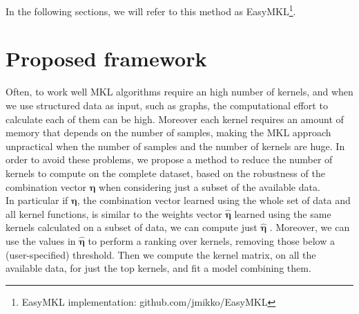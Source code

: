 \documentclass{esannV2}
\newcommand{\yy}{{\bf y}}
\newcommand{\KK}{{\bf K}}
\newcommand{\YY}{{\bf Y}}
\newcommand{\XX}{{\bf X}}
\newcommand{\1}{{\bf 1}}
\begin{document}
In the following sections, we will refer to this method as EasyMKL\footnote{EasyMKL implementation: github.com/jmikko/EasyMKL}.


\section{Proposed framework}
Often, to work well MKL algorithms require an high number of kernels, and when we use structured data as input, such as graphs, the computational effort to calculate each of them can be high. Moreover each kernel requires an amount of memory that depends on the number of samples, making the MKL approach unpractical when the number of samples and the number of kernels are huge.
In order to avoid these problems, we propose a method to reduce the number of kernels to compute on the complete dataset, based on the robustness of the combination vector $\boldsymbol{\eta}$ when considering just a subset of the available data.\\
In particular if $\boldsymbol{\eta}$, the combination vector learned using the whole set of data and all kernel functions, is similar to the weights vector $\hat{\boldsymbol{\eta}}$ learned using the same kernels calculated on a subset of data, we can compute just $\hat{\boldsymbol{\eta}}$ .
Moreover, we can use the values in $\hat{\boldsymbol{\eta}}$ to perform a ranking over kernels, removing those below a (user-specified) threshold.
Then we compute the kernel matrix, on all the available data, for just the top kernels, and fit a model combining them.

\end{document}
